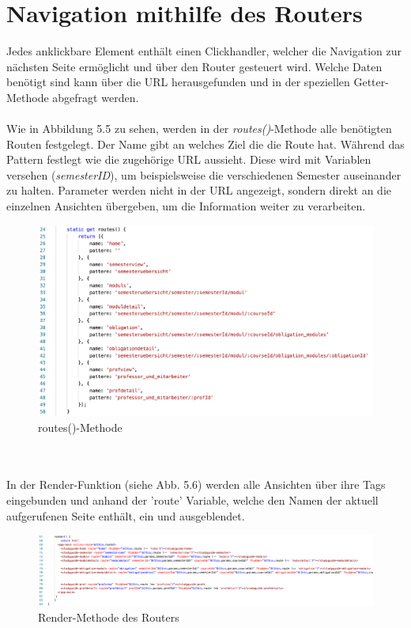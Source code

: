 \documentclass[12pt,					%
							 oneside,			%
							 a4paper,			%
							 halfparskip,		%
							 liststotoc,			%
							 bibtotoc,			%
							 fleqn,				%
							 pointlessnumbers]	%
							 {scrreprt}
\begin{document}
	\section{Navigation mithilfe des Routers}
	Jedes anklickbare Element enthält einen Clickhandler, welcher die Navigation zur nächsten Seite ermöglicht und über den Router gesteuert wird. Welche Daten benötigt sind kann über die URL herausgefunden und in der speziellen Getter-Methode abgefragt werden.	\\
\\	
	Wie in Abbildung 5.5 zu sehen, werden in der \textit{routes()}-Methode alle benötigten Routen festgelegt.
Der Name gibt an welches Ziel die die Route hat. Während das Pattern festlegt wie die zugehörige URL aussieht. Diese wird mit Variablen versehen (\textit{semesterID}), um beispielsweise die verschiedenen Semester auseinander zu halten. Parameter werden nicht in der URL angezeigt, sondern direkt an die einzelnen Ansichten übergeben, um die Information weiter zu verarbeiten. 
\begin{figure}[h]
		\centering
		\includegraphics[width=1\textwidth]{pictures/routes-methode.png}
		\caption{routes()-Methode}						
		\label{routes}
	\end{figure} \\
	\\
	In der Render-Funktion (siehe Abb. 5.6) werden alle Ansichten über ihre Tags eingebunden und anhand der 'route' Variable, welche den Namen der aktuell aufgerufenen Seite enthält, ein und ausgeblendet.\\	
	\begin{figure}[h]
		\centering
		\includegraphics[width=1\textwidth]{pictures/router-render.png}
		\caption{Render-Methode des Routers}						
		\label{routes}
	\end{figure}
\\
\\
\end{document}
